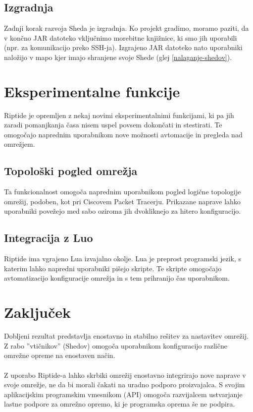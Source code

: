 \documentclass[12pt]{article}
\begin{document}
\subsection{Izgradnja}
Zadnji korak razvoja Sheda je izgradnja. Ko projekt gradimo, moramo paziti,
da v končno JAR datoteko vključnimo morebitne knjižnice, ki smo jih
uporabili (npr. za komunikacijo preko SSH-ja). Izgrajeno JAR datoteko nato
uporabniki naložijo v mapo kjer imajo shranjene svoje Shede
(glej \ref{nalaganje-shedov}).
\newpage

\section{Eksperimentalne funkcije}
Riptide je opremljen z nekaj novimi eksperimentalnimi funkcijami,
ki pa jih zaradi pomanjkanja časa nisem uspel povsem dokončati in
stestirati. Te omogočajo naprednim uporabnikom nove možnosti avtomacije
in pregleda nad omrežjem.

\subsection{Topološki pogled omrežja}
Ta funkcionalnost omogoča naprednim uporabnikom pogled logične topologije
omrežij, podoben, kot pri Ciscovem Packet Tracerju. Prikazane naprave
lahko uporabniki povežejo med sabo oziroma jih dvokliknejo za hitero
konfiguracijo.

\subsection{Integracija z Luo}
Riptide ima vgrajeno Lua izvajalno okolje. Lua je preprost programski jezik,
s katerim lahko napredni uporabniki pišejo skripte. Te skripte omogočajo
avtomatizacijo konfiguracije omrežja in s tem prihranijo čas uporabnikom.
\newpage

\section{Zaključek}
Dobljeni rezultat predstavlja enostavno in stabilno rešitev za nastavitev
omrežij. Z rabo ''vtičnikov'' (Shedov) omogoča uporabnikom konfiguracijo
različne omrežne opreme na enostaven način.
\\\\
Z uporabo Riptide-a lahko skrbiki omrežij enostavno integrirajo nove
naprave v svoje omrežje, ne da bi morali čakati na uradno podporo
proizvajalca. S svojim aplikacijskim programskim vmesnikom (API) omogoča
razvijalcem ustvarjanje lastne podpore za omrežno opremo, ki je programska
oprema še ne podpira.
\newpage
\end{document}
